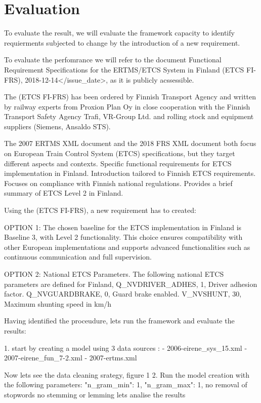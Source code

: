 \chapter{Evaluation} \label{chap:chap6}

To evaluate the result, we will evaluate the framework capacity to identify requierments subjected to change by the introduction of a new requirement.

To evaluate the perfomrance we will refer to the document Functional Requirement Specifications for the ERTMS/ETCS System in Finland (ETCS FI-FRS), 2018-12-14</issue_date>, as it is publicly acssessible. 


The (ETCS FI-FRS) has been ordered by Finnish Transport Agency and written by railway experts from Proxion Plan Oy in close cooperation with the Finnish
Transport Safety Agency Trafi, VR-Group Ltd. and rolling stock and equipment suppliers (Siemens, Ansaldo STS).

The 2007 ERTMS XML document and the 2018 FRS XML document both focus on European Train Control System (ETCS) specifications, but they target different aspects and contexts. 
Specific functional requirements for ETCS implementation in Finland.
Introduction tailored to Finnish ETCS requirements.
Focuses on compliance with Finnish national regulations.
Provides a brief summary of ETCS Level 2 in Finland.


Using the (ETCS FI-FRS), a new requirement has to created:

OPTION 1: The chosen baseline for the ETCS implementation in Finland is Baseline 3, with Level 2 functionality. This choice ensures compatibility with other European implementations and supports advanced functionalities such as continuous communication and full supervision.

OPTION 2: National ETCS Parameters. The following national ETCS parameters are defined for Finland, Q_NVDRIVER_ADHES, 1, Driver adhesion factor. Q_NVGUARDBRAKE, 0, Guard brake enabled. V_NVSHUNT, 30, Maximum shunting speed in km/h


Having identified the proceudure, lets run the framework and evaluate the results:

1.
start by creating a model using 3 data sources :
- 2006-eirene_sys_15.xml 
- 2007-eirene_fun_7-2.xml 
- 2007-ertms.xml


Now lets see the data cleaning srategy, figure 1 
2. Run the model creation with the following parameters: 
"n_gram_min": 1,
"n_gram_max": 1,
no removal of stopwords 
no stemming or lemming
lets analise the results





